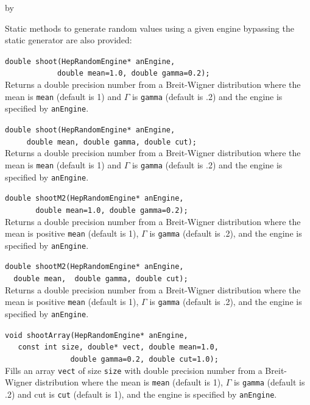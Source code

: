 \documentclass[twoside]{article}
\newcommand{\comp}[1]{\texttt{#1}}%
\newcommand{\entrylabel}[1]{\mbox{\textbf{{#1}}}\hfil}%
\newenvironment{entry}
{\begin{list}{}%
    {\renewcommand{\makelabel}{\entrylabel}%
     \setlength{\labelwidth}{90pt}%
     \setlength{\leftmargin}{\labelwidth}
     \advance\leftmargin by \labelsep%
      }%
    }%
  {\end{list}}
\newcommand{\Entrylabel}[1]%
{\raisebox{0pt}[1ex][0pt]{\makebox[\labelwidth][l]%
    {\parbox[t]{\labelwidth}{\hspace{0pt}\textbf{{#1}}}}}}
\newenvironment{Entry}%
{\renewcommand{\entrylabel}{\Entrylabel}\begin{entry}}%
  {\end{entry}}
\begin{document}
\begin{Entry}
    Static methods to generate random values using a given engine
    bypassing the static generator are also provided:

    \verb+double shoot(HepRandomEngine* anEngine,+\\
    \verb+            double mean=1.0, double gamma=0.2);+\\
    Returns a double precision number from a Breit-Wigner
    distribution where the mean is \comp{mean} (default is 1)
    and $\Gamma$ is \comp{gamma} (default is .2) and the engine
    is specified by \comp{anEngine}.
    
    \verb+double shoot(HepRandomEngine* anEngine,+\\
    \verb+     double mean, double gamma, double cut);+\\
    Returns a double precision number from a Breit-Wigner
    distribution where the mean is \comp{mean} (default is 1)
    and $\Gamma$ is \comp{gamma} (default is .2) and the engine
    is specified by \comp{anEngine}.
    
    \verb+double shootM2(HepRandomEngine* anEngine,+\\
    \verb+       double mean=1.0, double gamma=0.2);+\\
    Returns a double precision number from a Breit-Wigner
    distribution where the mean is positive \comp{mean} (default is 1),
    $\Gamma$ is \comp{gamma} (default is .2), and the engine
    is specified by \comp{anEngine}.
    
    \verb+double shootM2(HepRandomEngine* anEngine,+\\
    \verb+  double mean,  double gamma, double cut);+\\
    Returns a double precision number from a Breit-Wigner
    distribution where the mean is positive \comp{mean} (default is 1),
    $\Gamma$ is \comp{gamma} (default is .2), and the engine
    is specified by \comp{anEngine}.
    
    \verb+void shootArray(HepRandomEngine* anEngine,+\\
    \verb+   const int size, double* vect, double mean=1.0,+\\
    \verb+               double gamma=0.2, double cut=1.0);+\\
    Fills an array \comp{vect} of size \comp{size} with double
    precision number from a Breit-Wigner
    distribution where the mean is \comp{mean} (default is 1),
    $\Gamma$ is \comp{gamma} (default is .2) and cut is
    \comp{cut} (default is 1), and the engine is specified
    by \comp{anEngine}.


\end{Entry}
\end{document}
